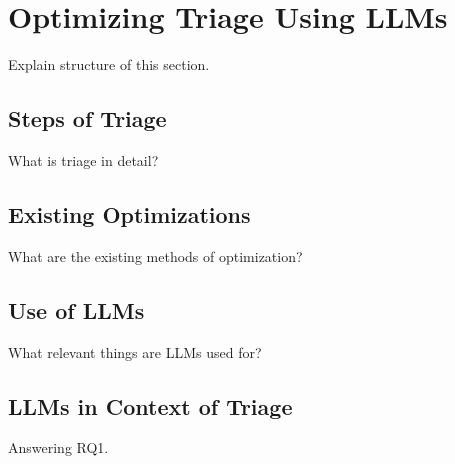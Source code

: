 \section{Optimizing Triage Using LLMs}
\label{sec:rq1}

Explain structure of this section.

\subsection{Steps of Triage}
\label{subsec:rq1-steps-of-triage}

What is triage in detail?

\subsection{Existing Optimizations}
\label{subsec:rq1-existing-optimizations}

What are the existing methods of optimization?

\subsection{Use of LLMs}
\label{subsec:rq1-use-of-llms}

What relevant things are LLMs used for?

\subsection{LLMs in Context of Triage}
\label{subsec:rq1-llms-in-context}

Answering RQ1.